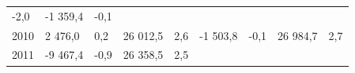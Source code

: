 \begin{longtable}[]{@{}lllllllll@{}}
\begin{minipage}[t]{0.06\columnwidth}
-2,0\strut
\end{minipage} & \begin{minipage}[t]{0.09\columnwidth}\raggedright
-1 359,4\strut
\end{minipage} & \begin{minipage}[t]{0.06\columnwidth}\raggedright
-0,1\strut
\end{minipage}\tabularnewline
\begin{minipage}[t]{0.05\columnwidth}\raggedright
2010\strut
\end{minipage} & \begin{minipage}[t]{0.10\columnwidth}\raggedright
2 476,0\strut
\end{minipage} & \begin{minipage}[t]{0.06\columnwidth}\raggedright
0,2\strut
\end{minipage} & \begin{minipage}[t]{0.16\columnwidth}\raggedright
26 012,5\strut
\end{minipage} & \begin{minipage}[t]{0.06\columnwidth}\raggedright
2,6\strut
\end{minipage} & \begin{minipage}[t]{0.12\columnwidth}\raggedright
-1 503,8\strut
\end{minipage} & \begin{minipage}[t]{0.06\columnwidth}\raggedright
-0,1\strut
\end{minipage} & \begin{minipage}[t]{0.09\columnwidth}\raggedright
26 984,7\strut
\end{minipage} & \begin{minipage}[t]{0.06\columnwidth}\raggedright
2,7\strut
\end{minipage}\tabularnewline
\begin{minipage}[t]{0.05\columnwidth}\raggedright
2011\strut
\end{minipage} & \begin{minipage}[t]{0.10\columnwidth}\raggedright
-9 467,4\strut
\end{minipage} & \begin{minipage}[t]{0.06\columnwidth}\raggedright
-0,9\strut
\end{minipage} & \begin{minipage}[t]{0.16\columnwidth}\raggedright
26 358,5\strut
\end{minipage} & \begin{minipage}[t]{0.06\columnwidth}\raggedright
2,5\strut
\end{minipage} & \begin{minipage}[t]{0.12\columnwidth}\raggedright

\end{minipage}
\end{longtable}
